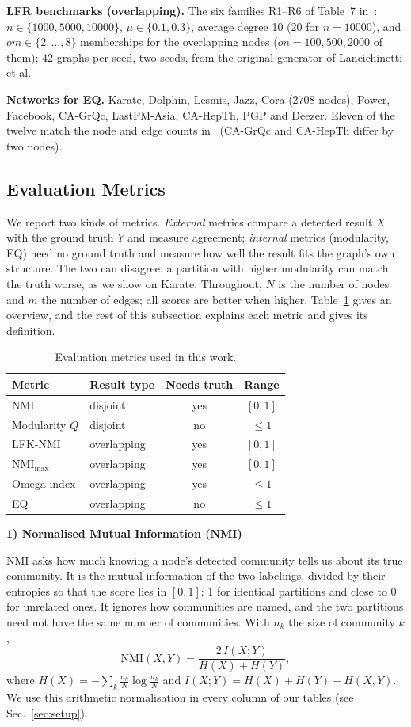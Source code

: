 \documentclass[conference]{IEEEtran}
\newcommand{\metrichead}[1]{\par\smallskip\noindent\textbf{#1}\par\nobreak\vspace{1pt}}
\begin{document}
\textbf{LFR benchmarks (overlapping).} The six families R1--R6 of Table~7 in~\cite{kong2026}: $n\in\{1000,5000,10000\}$, $\mu\in\{0.1,0.3\}$, average degree 10 (20 for $n=10000$), and $om\in\{2,\dots,8\}$ memberships for the overlapping nodes ($on=100,500,2000$ of them); 42 graphs per seed, two seeds, from the original generator of Lancichinetti et al.

\textbf{Networks for EQ.} Karate, Dolphin, Lesmis, Jazz, Cora (2708 nodes), Power, Facebook, CA-GrQc, LastFM-Asia, CA-HepTh, PGP and Deezer. Eleven of the twelve match the node and edge counts in~\cite{kong2026} (CA-GrQc and CA-HepTh differ by two nodes).

\subsection{Evaluation Metrics}\label{sec:metrics}
We report two kinds of metrics. \emph{External} metrics compare a detected result $X$ with the ground truth $Y$ and measure agreement; \emph{internal} metrics (modularity, EQ) need no ground truth and measure how well the result fits the graph's own structure. The two can disagree: a partition with higher modularity can match the truth worse, as we show on Karate. Throughout, $N$ is the number of nodes and $m$ the number of edges; all scores are better when higher. Table~\ref{tab:metrics} gives an overview, and the rest of this subsection explains each metric and gives its definition.
\begin{table}[H]
\centering
\caption{Evaluation metrics used in this work.}
\label{tab:metrics}
\scriptsize
\setlength{\tabcolsep}{3pt}
\begin{tabular}{llcc}
\toprule
Metric & Result type & Needs truth & Range \\
\midrule
NMI & disjoint & yes & $[0,1]$ \\
Modularity $Q$ & disjoint & no & $\le 1$ \\
LFK-NMI & overlapping & yes & $[0,1]$ \\
$\mathrm{NMI}_{\max}$ & overlapping & yes & $[0,1]$ \\
Omega index & overlapping & yes & $\le 1$ \\
EQ & overlapping & no & $\le 1$ \\
\bottomrule
\end{tabular}
\end{table}

\metrichead{1) Normalised Mutual Information (NMI)}
NMI asks how much knowing a node's detected community tells us about its true community. It is the mutual information of the two labelings, divided by their entropies so that the score lies in $[0,1]$: 1 for identical partitions and close to 0 for unrelated ones. It ignores how communities are named, and the two partitions need not have the same number of communities. With $n_k$ the size of community $k$,
\begin{equation}
\mathrm{NMI}(X,Y)=\frac{2\,I(X;Y)}{H(X)+H(Y)},\label{eq:nmi}
\end{equation}
where $H(X)=-\sum_k\frac{n_k}{N}\log\frac{n_k}{N}$ and $I(X;Y)=H(X)+H(Y)-H(X,Y)$. We use this arithmetic normalisation in every column of our tables (see Sec.~\ref{sec:setup}).
\end{document}
